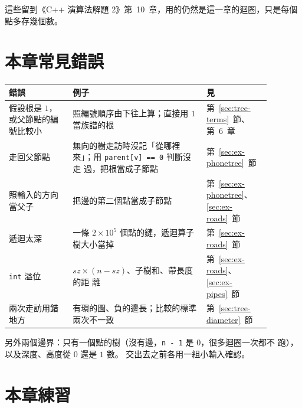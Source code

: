 這些留到《C++ 演算法解題 2》第~10~章，用的仍然是這一章的迴圈，只是每個點多存幾個數。

\section{本章常見錯誤}
\label{sec:tree-pitfalls}

\begin{center}
\begin{tabular}{p{0.22\linewidth}p{0.46\linewidth}p{0.2\linewidth}}
\toprule
錯誤 & 例子 & 見 \\
\midrule
假設根是 $1$，或父節點的編號比較小 & 照編號順序由下往上算；直接用 $1$ 當族譜的根 &
第~\ref{sec:tree-terms}~節、第~6~章 \\
走回父節點 & 無向的樹走訪時沒記「從哪裡來」；用 \texttt{parent[v] == 0} 判斷沒走
過，把根當成子節點 & 第~\ref{sec:ex-phonetree}~節 \\
照輸入的方向當父子 & 把邊的第二個點當成子節點 & 第~\ref{sec:ex-phonetree}、
\ref{sec:ex-roads}~節 \\
遞迴太深 & 一條 $2 \times 10^5$ 個點的鏈，遞迴算子樹大小當掉 &
第~\ref{sec:ex-roads}~節 \\
\texttt{int} 溢位 & $\mathit{sz} \times (n - \mathit{sz})$、子樹和、帶長度的距
離 & 第~\ref{sec:ex-roads}、\ref{sec:ex-pipes}~節 \\
兩次走訪用錯地方 & 有環的圖、負的邊長；比較的標準兩次不一致 &
第~\ref{sec:tree-diameter}~節 \\
\bottomrule
\end{tabular}
\end{center}

另外兩個邊界：只有一個點的樹（沒有邊，\texttt{n - 1} 是 $0$，很多迴圈一次都不
跑），以及深度、高度從 $0$ 還是 $1$ 數。 交出去之前各用一組小輸入確認。

\section{本章練習}
\label{sec:ch13-exercises}

